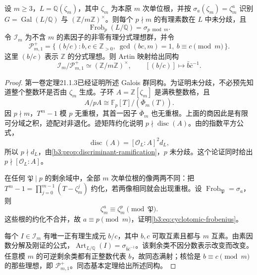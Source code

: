 \begin{theorem}\label{b3:thm:cyclotomic-frobenius-reciprocity}
	设 \(m\ge3\)，\(L=\mathbb Q(\zeta_m)\)，其中 \(\zeta_m\) 为本原 \(m\) 次单位根，并按 \(\sigma_a(\zeta_m)=\zeta_m^a\) 识别 \(G=\operatorname{Gal}(L/\mathbb Q)\) 与 \((\mathbb Z/m\mathbb Z)^\times\)。则每个 \(p\nmid m\) 的有理素数在 \(L\) 中未分歧，且
	\begin{equation}\label{b3:eq:cyclotomic-frobenius}
		\operatorname{Frob}_p(L/\mathbb Q)=\sigma_{p\bmod m}.
	\end{equation}
	令 \(\mathcal I_m\) 为不含 \(m\) 的素因子的非零有理分式理想群，并令
	\[
		\mathcal P_{m,1}^{+}=
		\{\,(b/c):b,c\in\mathbb Z_{>0},\ \gcd(bc,m)=1,\ b\equiv c\pmod m\,\}.
	\]
	这里 \((b/c)\) 表示 \(\mathbb Z\) 的分式理想。则 Artin 映射给出同构
	\[
		\mathcal I_m/\mathcal P_{m,1}^{+}
		\simeq(\mathbb Z/m\mathbb Z)^\times,\qquad
		[(b/c)]\longmapsto\bar b\bar c^{-1}.
	\]
\end{theorem}
\begin{proof}
	第一卷定理21.1.3已经证明所述 Galois 群同构。为证明未分歧，不必预先知道整个整数环是否由 \(\zeta_m\) 生成。子环 \(A=\mathbb Z[\zeta_m]\) 是满秩整数格，且
	\[
		A/pA\cong\mathbb F_p[T]/(\overline\Phi_m(T)).
	\]
	因 \(p\nmid m\)，\(T^m-1\) 模 \(p\) 无重根，其首一因子 \(\overline\Phi_m\) 也无重根。上面的商因此是有限可分域之积，迹配对非退化。迹矩阵约化说明 \(p\nmid\operatorname{disc}(A)\)。由的指数平方公式，
	\[
		\operatorname{disc}(A)=[\mathcal O_L:A]^2d_L,
	\]
	所以 \(p\nmid d_L\)，由\cref{b3:prop:discriminant-ramification}，\(p\) 未分歧。这个论证同时给出 \(p\nmid[\mathcal O_L:A]\)。

	在任何 \(\mathfrak P\mid p\) 的剩余域中，全部 \(m\) 次单位根的像两两不同：把 \(T^m-1=\prod_{j=0}^{m-1}(T-\zeta_m^j)\) 约化，若两像相同就会出现重根。设 \(\operatorname{Frob}_{\mathfrak P}=\sigma_a\)，则
	\[
		\zeta_m^a\equiv\zeta_m^p\pmod{\mathfrak P}.
	\]
	这些根的约化不合并，故 \(a\equiv p\pmod m\)，证明\eqref{b3:eq:cyclotomic-frobenius}。

	每个 \(I\in\mathcal I_m\) 有唯一正有理生成元 \(b/c\)，其中 \(b,c\) 可取互素且都与 \(m\) 互素。由素因数分解及刚证的公式，\(\operatorname{Art}_{L/\mathbb Q}(I)=\sigma_{\bar b\bar c^{-1}}\)。该剩余类不因分数表示改变而改变。任意模 \(m\) 的可逆剩余类都有正整数代表 \(b\)，故同态满射；核恰是 \(b\equiv c\pmod m\) 的那些理想，即 \(\mathcal P_{m,1}^{+}\)。同态基本定理给出所述同构。
\end{proof}

